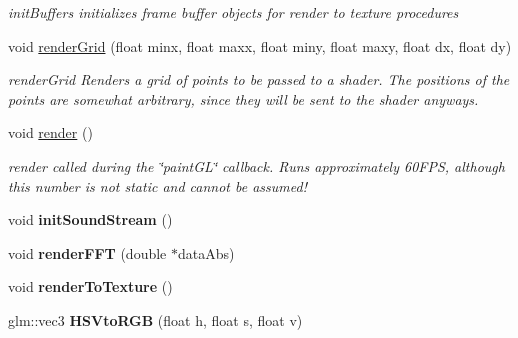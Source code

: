 \begin{DoxyCompactItemize}
\begin{DoxyCompactList}\small\item\em init\+Buffers initializes frame buffer objects for render to texture procedures \end{DoxyCompactList}\item 
void \hyperlink{classglrenderer_ad59e653833eaab9f9eb1e60ef3cec332}{render\+Grid} (float minx, float maxx, float miny, float maxy, float dx, float dy)
\begin{DoxyCompactList}\small\item\em render\+Grid Renders a grid of points to be passed to a shader. The positions of the points are somewhat arbitrary, since they will be sent to the shader anyways. \end{DoxyCompactList}\item 
\hypertarget{classglrenderer_a7e1a9ca2d682ef93705dd85d27dec830}{void \hyperlink{classglrenderer_a7e1a9ca2d682ef93705dd85d27dec830}{render} ()}\label{classglrenderer_a7e1a9ca2d682ef93705dd85d27dec830}

\begin{DoxyCompactList}\small\item\em render called during the \char`\"{}paint\+G\+L\char`\"{} callback. Runs approximately 60\+F\+P\+S, although this number is not static and cannot be assumed! \end{DoxyCompactList}\item 
\hypertarget{classglrenderer_a7751070a6f58b09f9b027e59d7533011}{void {\bfseries init\+Sound\+Stream} ()}\label{classglrenderer_a7751070a6f58b09f9b027e59d7533011}

\item 
\hypertarget{classglrenderer_a27bd7bcc2c4defe5152816e8e8ac690c}{void {\bfseries render\+F\+F\+T} (double $\ast$data\+Abs)}\label{classglrenderer_a27bd7bcc2c4defe5152816e8e8ac690c}

\item 
\hypertarget{classglrenderer_a80b4fe511f5c6cc6a09c7daf4f3f3d62}{void {\bfseries render\+To\+Texture} ()}\label{classglrenderer_a80b4fe511f5c6cc6a09c7daf4f3f3d62}

\item 
\hypertarget{classglrenderer_ad79d4e42fb594df49bde8ea5765151fc}{glm\+::vec3 {\bfseries H\+S\+Vto\+R\+G\+B} (float h, float s, float v)}\label{classglrenderer_ad79d4e42fb594df49bde8ea5765151fc}

\end{DoxyCompactItemize}
